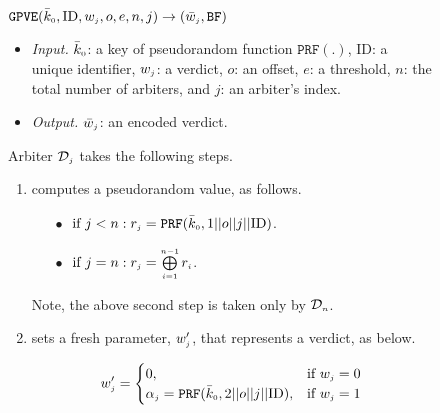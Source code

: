 \begin{figure}[hbt!]
\setlength{\fboxsep}{0.8pt}
\begin{center}
\begin{boxedminipage}{12.4cm}
\small{
\underline{$\mathtt{GPVE}(\bar{k}_{\scriptscriptstyle 0}, \text{ID},  w_{\scriptscriptstyle j}, o, e, n,  j)\rightarrow  (\bar{  w}_{\scriptscriptstyle j}, \mathtt{BF})$}\\
%
\begin{itemize}
\item \noindent\textit{Input.} $\bar{k}_{\scriptscriptstyle 0}$: a key of  pseudorandom function $\mathtt{PRF}(.)$, $\text{ID}$: a unique identifier, $ w_{\scriptscriptstyle j}$: a  verdict, $o$: an offset, $e$: a threshold, $n$: the total number of  arbiters,  and  $j$: an arbiter's index.
%
\item \noindent\textit{Output.} $\bar{  w}_{\scriptscriptstyle j}$:  an  encoded verdict.  
%
\end{itemize}
Arbiter $\mathcal{D}_{\scriptscriptstyle j}$ takes the following steps.
\begin{enumerate}
%
\item\label{ZSPA:val-gen} computes a  pseudorandom  value,  as follows. 
%
%
\begin{itemize}
%
\item[$\bullet$]$ \text{ if } j< n: r_{\scriptscriptstyle j}=\mathtt{PRF}(\bar k_{\scriptscriptstyle 0}, 1||o||j||\text{ID})$.\\
%
\item [$\bullet$] $ \text{ if } j=n: r_{\scriptscriptstyle j}= \bigoplus\limits^{\scriptscriptstyle n-1}_{\scriptscriptstyle i=1} r_{\scriptscriptstyle i}$.
%
\end{itemize}
Note, the above second step is taken only by $\mathcal{D}_{\scriptscriptstyle n}$.
%
\item  sets a fresh parameter, $w'_{\scriptscriptstyle j}$, that represents a verdict, as below. 
%

%
%
\begin{equation*}
   w'_{\scriptscriptstyle j}= 
\begin{cases}
   0,              & \text{if } w_{\scriptscriptstyle j}=0\\
   \alpha_{\scriptscriptstyle j}=\mathtt{PRF}(\bar k_{\scriptscriptstyle 0}, 2||o||j||\text{ID}) ,& \text{if } w_{\scriptscriptstyle j}=1\\


\end{cases}
\end{equation*}
\end{enumerate}}
\end{boxedminipage}
\end{center}
\end{figure}

